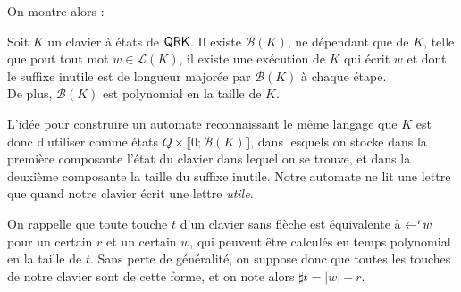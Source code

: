 \documentclass[12pt, a4paper]{article}
\renewcommand{\L}{\mathcal{L}}
\begin{document}
    On montre alors :
    \begin{inutilesbornés}\label{bk}
        Soit $K$ un clavier à états de $\mathsf{QRK}$. Il existe $\mathcal{B}(K)$, ne dépendant que de $K$, telle que pout tout mot $w \in \L(K)$,
        il existe une exécution de $K$ qui écrit $w$ et dont le suffixe inutile est de longueur majorée par $\mathcal{B}(K)$ à chaque étape. \\
        De plus, $\mathcal{B}(K)$ est polynomial en la taille de $K$.
    \end{inutilesbornés}
    L'idée pour construire un automate reconnaissant le même langage que $K$ est donc d'utiliser comme états $Q \times \llbracket 0 ; \mathcal{B}(K) \rrbracket$, dans lesquels on stocke dans la première composante l'état du clavier dans lequel on se trouve,
    et dans la deuxième composante la taille du suffixe inutile. Notre automate ne lit une lettre que quand notre clavier écrit une lettre \emph{utile}.
    
    On rappelle que toute touche $t$ d'un clavier sans flèche est équivalente à $\mathord{\leftarrow}^r w$ pour un certain $r$ et un certain $w$, qui peuvent être calculés en temps polynomial en la taille de $t$. Sans perte de généralité, on suppose donc que toutes les touches de notre clavier sont de cette forme, et on note alors $\sharp t = |w| - r$.
\end{document}
